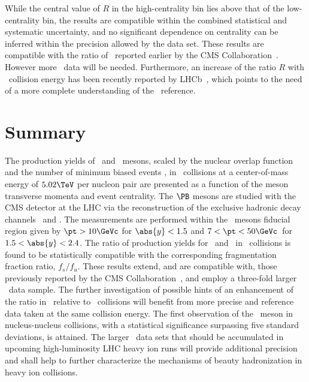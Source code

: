 While the central value of $R$ in the high-centrality bin lies above that of the low-centrality bin, the results are compatible within the combined statistical and systematic uncertainty, and      
no significant dependence on centrality can be inferred within the precision allowed by the data set.
These results are compatible with the ratio of \RAA\ reported earlier by the CMS Collaboration~\cite{BsPbPbCMS}.
However more \PbPb\ data will be needed. Furthermore, an increase of the ratio $R$ with \pp\ collision energy has been recently reported by LHCb~\cite{fsfulhcb2020}, 
which points to the need of a more complete understanding of the \pp\ reference. 


\section{Summary}

The production yields %
of \PBzs\ and \PBp\ mesons,
scaled by the nuclear overlap function \TAA and the number of minimum biased events \NMB,
in \PbPb\ collisions at a center-of-mass energy of $5.02\TeV$ per nucleon pair are presented as a function of the meson transverse momenta and event centrality.
The $\PB$ mesons are studied with the CMS detector at the LHC via the reconstruction of the exclusive hadronic decay channels \Bzerosdecayall\ and \Bplusdecayall. 
The measurements are performed within the \PB\ mesons fiducial region given by 
$\pt>10\GeVc$ for $\abs{y}<1.5$  and  $7<\pt<50\GeVc \,$ for $1.5<\abs{y}<2.4$.
%
The ratio of production yields for \PBzs\ and \PBp\ in \PbPb\ collisions is found to be statistically compatible with the corresponding fragmentation fraction ratio, $f_s/f_u$.  
%
These results extend, and are compatible with, those previously reported by the CMS Collaboration~\cite{BsPbPbCMS,BpPbPbCMS}, and employ a three-fold larger \PbPb\ data sample.
The further investigation of possible hints of an enhancement of the ratio in \PbPb\ relative to \pp\ collisions will benefit from more precise \PbPb and \pp reference data taken at the same collision energy.  
The first observation of the \PBzs\ meson in nucleus-nucleus collisions, with a statistical significance surpassing five standard deviations, is attained. 
%
The larger \PbPb\ data sets that should be accumulated in upcoming high-luminosity LHC heavy ion runs will provide additional precision and shall help to further characterize the mechanisms of beauty hadronization in heavy ion collisions.

